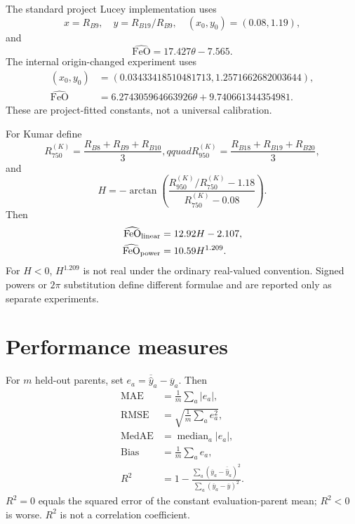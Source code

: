 \documentclass[11pt]{article}
\newcommand{\MAE}{\operatorname{MAE}}
\newcommand{\RMSE}{\operatorname{RMSE}}
\newcommand{\FeO}{\mathrm{FeO}}
\begin{document}
The standard project Lucey implementation uses
\begin{equation}
 x=R_{B9},\quad y=R_{B19}/R_{B9},\quad (x_0,y_0)=(0.08,1.19),
\end{equation}
and
\begin{equation}
 \widehat{\FeO}=17.427\theta-7.565.
\end{equation}
The internal origin-changed experiment uses
\begin{align}
 (x_0,y_0)&=(0.03433418510481713,1.2571662682003644),\\
 \widehat{\FeO}&=6.274305964663926\theta+9.740661344354981.
\end{align}
These are project-fitted constants, not a universal calibration.

For Kumar define
\begin{equation}
 R_{750}^{(K)}=\frac{R_{B8}+R_{B9}+R_{B10}}3,qquad
 R_{950}^{(K)}=\frac{R_{B18}+R_{B19}+R_{B20}}3,
\end{equation}
and
\begin{equation}
 H=-\arctan\!\left(
 \frac{R_{950}^{(K)}/R_{750}^{(K)}-1.18}{R_{750}^{(K)}-0.08}
 \right).
\end{equation}
Then
\begin{align}
 \widehat{\FeO}_{\rm linear}&=12.92H-2.107,\\
 \widehat{\FeO}_{\rm power}&=10.59H^{1.209}.
\end{align}
For $H<0$, $H^{1.209}$ is not real under the ordinary real-valued convention. Signed powers or $2\pi$ substitution define different formulae and are reported only as separate experiments.

\section{Performance measures}
For $m$ held-out parents, set $e_a=\overline{\widehat y}_a-\overline y_a$. Then
\begin{align}
 \MAE&=\frac1m\sum_a|e_a|,\\
 \RMSE&=\sqrt{\frac1m\sum_ae_a^2},\\
 \operatorname{MedAE}&=\operatorname{median}_a|e_a|,\\
 \operatorname{Bias}&=\frac1m\sum_ae_a,\\
 R^2&=1-\frac{\sum_a(\overline y_a-\overline{\widehat y}_a)^2}
 {\sum_a(\overline y_a-\overline y)^2}.
\end{align}
$R^2=0$ equals the squared error of the constant evaluation-parent mean; $R^2<0$ is worse. $R^2$ is not a correlation coefficient.
\end{document}
